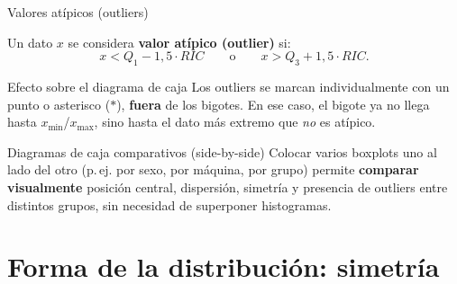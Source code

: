 \documentclass[aspectratio=169,11pt]{beamer}
\begin{document}
\begin{frame}{Valores atípicos (outliers)}
\begin{definition}
Un dato $x$ se considera \textbf{valor atípico (outlier)} si:
\[
x < Q_1 - 1{,}5\cdot RIC \qquad \text{o} \qquad x > Q_3 + 1{,}5\cdot RIC.
\]
\end{definition}
\begin{block}{Efecto sobre el diagrama de caja}
Los outliers se marcan individualmente con un punto o asterisco ($*$), \textbf{fuera} de los bigotes. En ese caso, el bigote ya no llega hasta $x_{\min}$/$x_{\max}$, sino hasta el dato más extremo que \emph{no} es atípico.
\end{block}
\begin{exampleblock}{Diagramas de caja comparativos (side-by-side)}
Colocar varios boxplots uno al lado del otro (p.\,ej. por sexo, por máquina, por grupo) permite \textbf{comparar visualmente} posición central, dispersión, simetría y presencia de outliers entre distintos grupos, sin necesidad de superponer histogramas.
\end{exampleblock}
\end{frame}

\section{Forma de la distribución: simetría}
\end{document}
